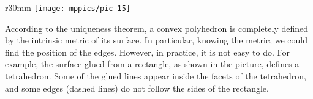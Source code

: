 \begin{wrapfigure}{r}{30mm}
\vskip-3mm
\centering
\texttt{[image: mppics/pic-15]}
\vskip-0mm
\end{wrapfigure}

According to the uniqueness theorem, a convex polyhedron is completely defined by the intrinsic metric of its surface.
In particular, knowing the metric, we could find the position of the edges.
However, in practice, it is not easy to do.
For example, the surface glued from a rectangle, as shown in the picture, defines a tetrahedron.
Some of the glued lines appear inside the facets of the tetrahedron, and some edges (dashed lines) do not follow the sides of the rectangle.


